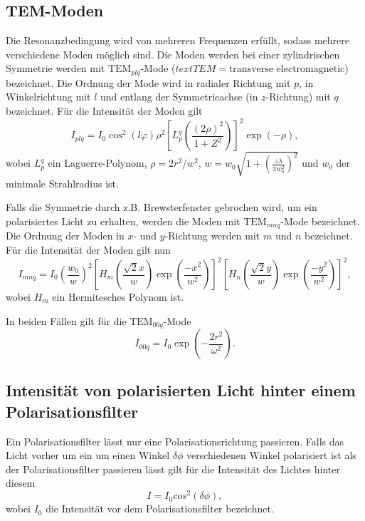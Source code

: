 \subsection{TEM-Moden}
Die Resonanzbedingung wird von mehreren Frequenzen erfüllt, sodass mehrere verschiedene Moden möglich sind. Die Moden werden bei einer zylindrischen Symmetrie werden mit $\text{TEM}_{plq}$-Mode ($text{TEM}=\text{transverse electromagnetic}$) bezeichnet. Die Ordnung der Mode wird in radialer Richtung mit $p$, in Winkelrichtung mit $l$ und entlang der Symmetrieachse (in $z$-Richtung) mit $q$ bezeichnet. Für die Intensität der Moden gilt
\begin{equation}
	I_{plq} = I_0 \cos^2 (l \varphi) \rho^2 \left[L_{p}^q\left(\frac{(2 \rho)^2}{1+Z^2} \right)\right] ^2 \exp\left(-\rho \right),
\end{equation}
wobei $L_{p}^q$ ein Laguerre-Polynom, $\rho=2 r^2 / w^2$, $w=w_0 \sqrt{1+\left(\frac{z \lambda}{\pi w_0^2}\right)^2}$ und $w_0$ der minimale Strahlradius ist.

Falls die Symmetrie durch z.B. Brewsterfenster gebrochen wird, um ein polarisiertes Licht zu erhalten, werden die Moden mit  $\text{TEM}_{mnq}$-Mode bezeichnet. Die Ordnung der Moden in $x$- und $y$-Richtung werden mit $m$ und $n$ bezeichnet. Für die Intensität der Moden gilt nun
\begin{equation}
I_{mnq} = I_0 \left(\frac{w_0}{w}\right)^2 \left[H_m\left(\frac{\sqrt{2} x}{w}\right) \exp\left(\frac{-x^2}{w^2}\right) \right]^2 \left[H_n\left(\frac{\sqrt{2} y}{w}\right) \exp\left(\frac{-y^2}{w^2}\right) \right]^2, \label{eq:tem}
\end{equation}
wobei $H_m$ ein Hermitesches Polynom ist.


In beiden Fällen gilt für die $\text{TEM}_{00q}$-Mode
\begin{equation}
I_{00q} = I_0 \exp\left(-\frac{2 r^2}{\omega ^2}\right). \label{eq:gaus}
\end{equation}

\subsection{Intensität von polarisierten Licht hinter einem Polarisationsfilter}
Ein Polarisationsfilter lässt nur eine Polarisationsrichtung passieren. Falls das Licht vorher um ein um einen Winkel $\delta\phi$ verschiedenen Winkel polarisiert ist als der Polarisationsfilter passieren lässt gilt für die Intensität des Lichtes hinter diesem
\begin{equation}
	I=I_0 cos^2(\delta\phi), \label{eq:polar}
\end{equation}
wobei $I_0$ die Intensität vor dem Polarisationsfilter bezeichnet.

